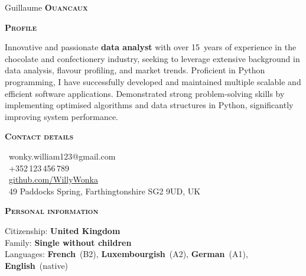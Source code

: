 \documentclass[11pt, a4paper]{article}
\newcommand{\headleft}[1]{\vspace*{3ex}\textsc{\textbf{#1}}\par%
    \vspace*{-1.5ex}\hrulefill\par\vspace*{0.7ex}}
\begin{document}
\setlength{\topskip}{0pt}
\setlength{\parindent}{0pt}
\setlength{\parskip}{0pt}
\setlength{\fboxsep}{0pt}
\pagestyle{empty}
\raggedbottom

\begin{minipage}[t]{0.33\textwidth} %
\colorbox{cvblue}{\begin{minipage}[t][5mm][t]{\textwidth}\null\hfill\null\end{minipage}}

\vspace{-.2ex} %
\colorbox{cvblue!90}{\color{white}  %
\textwidth\relax%
\begin{minipage}[t][293mm][t]{0.82\textwidth}
\raggedright
\vspace*{2.5ex}

\Large Guillaume \textbf{\textsc{Ouancaux}} \normalsize 



\vspace*{0.5ex} %

\headleft{Profile}
Innovative and passionate \textbf{data analyst} with over 15~years of experience in the chocolate and confectionery industry, seeking to leverage extensive background in data analysis, flavour profiling, and market trends.
Proficient in Python programming, I have successfully developed and maintained multiple scalable and efficient software applications.
Demonstrated strong problem-solving skills by implementing optimised algorithms and data structures in Python, significantly improving system performance.

\headleft{Contact details}
\small %
\MVAt\ {\small wonky.william123@gmail.com} \\[0.4ex]
\Mobilefone\ +352\,123\,456\,789 \\[0.5ex]
\Mundus\ \href{https://github.com/WillyWonka}{github.com/WillyWonka} \\[0.1ex]
\Letter\ 49 Paddocks Spring, Farthingtonshire SG2 9UD, UK
\normalsize

\headleft{Personal information}
Citizenship: \textbf{United Kingdom} \\[0.5ex]
Family: \textbf{Single without children} \\[0.5ex]
Languages: \textbf{French}~(B2), \textbf{Luxembourgish}~(A2), \textbf{German}~(A1), \textbf{English}~(native)


\end{minipage}}
\end{minipage}
\end{document}
